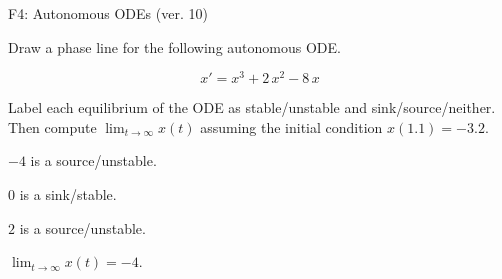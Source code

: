 \begin{exercise}
  \begin{exerciseTitle}F4: Autonomous ODEs (ver. 10)\end{exerciseTitle}
  \begin{exerciseStatement}
    

      Draw a phase line for the following 
      autonomous ODE.
    

    
\[x'= x^{3} + 2 \, x^{2} - 8 \, x\]

    

      Label each equilibrium of the ODE
      as stable/unstable and sink/source/neither.
      Then compute \(\lim_{t\to\infty}x(t)\)
      assuming the initial condition
      \(x( 1.1 )= -3.2\).
    

  \end{exerciseStatement}
  \begin{exerciseAnswer}
    

      \(-4\) is a source/unstable.
      
        \(0\) is a sink/stable.
      
      \(2\) is a source/unstable.
    

    

      \(\lim_{t\to\infty}x(t)=-4\).
    

  \end{exerciseAnswer}
\end{exercise}